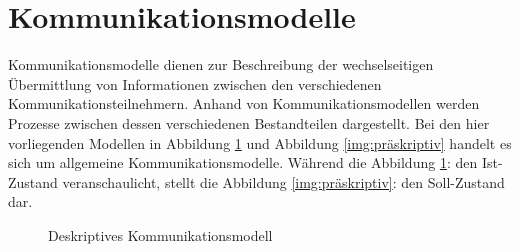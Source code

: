 \documentclass[a4paper,11pt]{article}%
\renewcommand{\\}{\vspace*{0.5\baselineskip} \newline}
\begin{document}
\newpage

\section{Kommunikationsmodelle}
Kommunikationsmodelle dienen zur Beschreibung der wechselseitigen Übermittlung von Informationen zwischen den verschiedenen Kommunikationsteilnehmern. Anhand von Kommunikationsmodellen werden Prozesse zwischen dessen verschiedenen Bestandteilen dargestellt. Bei den hier vorliegenden Modellen in Abbildung \ref{img:deskriptiv} und Abbildung \ref{img:präskriptiv} handelt es sich um allgemeine Kommunikationsmodelle. Während die Abbildung \ref{img:deskriptiv}:  den Ist-Zustand veranschaulicht, stellt die Abbildung \ref{img:präskriptiv}:  den Soll-Zustand dar.\\\\
\begin{figure}[H]
	\centering
	\setlength{\fboxsep}{1pt}
	\setlength{\fboxrule}{1pt}
	\captionsetup{justification=centering}
	\caption{Deskriptives Kommunikationsmodell}
	\label{img:deskriptiv}
\end{figure}
\end{document}
